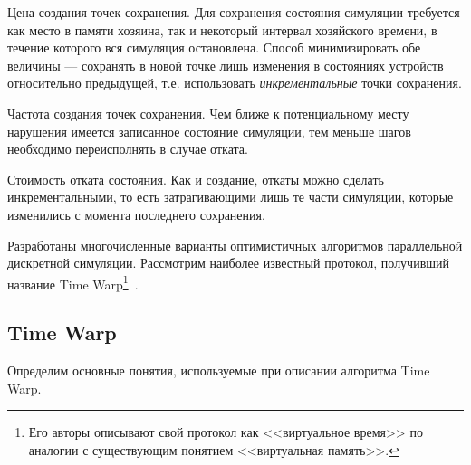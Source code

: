 \begin{description*}
    \item[Цена создания точек сохранения.] Для сохранения состояния симуляции требуется как место в памяти хозяина, так и некоторый интервал хозяйского времени, в течение которого вся симуляция остановлена. Способ минимизировать обе величины --- сохранять в новой точке лишь изменения в состояниях устройств относительно предыдущей, т.е. использовать \textit{инкрементальные} точки сохранения.
    \item[Частота создания точек сохранения.] Чем ближе к потенциальному месту нарушения имеется записанное состояние симуляции, тем меньше шагов необходимо переисполнять в случае отката.
    \item[Стоимость отката состояния.] Как и создание, откаты можно сделать инкрементальными, то есть затрагивающими лишь те части симуляции, которые изменились с момента последнего сохранения.
\end{description*}

Разработаны многочисленные варианты оптимистичных алгоритмов параллельной дискретной симуляции. Рассмотрим наиболее известный протокол, получивший название Time Warp\footnote{Его авторы описывают свой протокол как <<виртуальное время>> по аналогии с существующим понятием <<виртуальная память>>.}~\cite{virtual-time}.

\subsection{Time Warp}

Определим основные понятия, используемые при описании алгоритма Time Warp.

